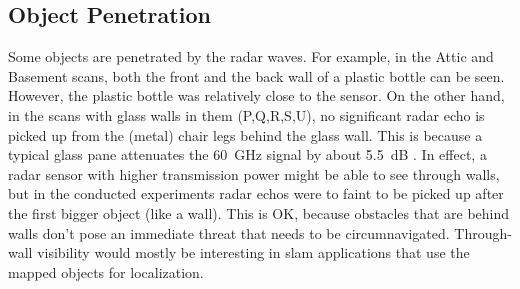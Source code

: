 \subsection{Object Penetration}\label{object-penetration}
Some objects are penetrated by the radar waves. For example, in the
Attic and Basement scans, both the front and the back wall of a
plastic bottle can be seen. However, the plastic bottle was relatively
close to the sensor. On the other hand, in the scans with glass walls in
them (P,Q,R,S,U), no significant radar echo is picked up from the
(metal) chair legs behind the glass wall. This is because a typical
glass pane attenuates the \SI{60}{GHz} signal by about \SI{5.5}{dB} \cite{Lu2014}. In
effect, a radar sensor with higher transmission power might be able to
see through walls, but in the conducted experiments radar echos were to
faint to be picked up after the first bigger object (like a wall).
This is OK, because obstacles that are behind walls don't pose an immediate threat that needs to be circumnavigated. Through-wall visibility would mostly be interesting in slam applications that use the mapped objects for localization.


